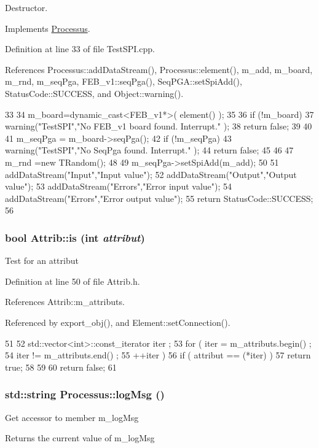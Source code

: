 Destructor. 

Implements \hyperlink{classProcessus_aee88ad7b77ae7319cf8b128e9dd2ea11}{Processus}.

Definition at line 33 of file TestSPI.cpp.

References Processus::addDataStream(), Processus::element(), m\_\-add, m\_\-board, m\_\-rnd, m\_\-seqPga, FEB\_\-v1::seqPga(), SeqPGA::setSpiAdd(), StatusCode::SUCCESS, and Object::warning().


\begin{DoxyCode}
33                                  {
34   m_board=dynamic_cast<FEB_v1*>( element() );
35   
36   if (!m_board){
37     warning("TestSPI","No FEB_v1 board found. Interrupt."  );
38     return false;
39   }
40 
41   m_seqPga = m_board->seqPga();
42   if (!m_seqPga){
43     warning("TestSPI","No SeqPga found. Interrupt."  );
44     return false;
45   }
46 
47   m_rnd =new TRandom();
48 
49   m_seqPga->setSpiAdd(m_add);
50   
51   addDataStream("Input","Input value");
52   addDataStream("Output","Output value");
53   addDataStream("Errors","Error input value");
54   addDataStream("Errors","Error output value");
55   return StatusCode::SUCCESS;
56 }
\end{DoxyCode}
\hypertarget{classAttrib_a704f26af560909ad22065083bb7d4c34}{
\subsubsection[{is}]{\setlength{\rightskip}{0pt plus 5cm}bool Attrib::is (int {\em attribut})}}
\label{classAttrib_a704f26af560909ad22065083bb7d4c34}
Test for an attribut 

Definition at line 50 of file Attrib.h.

References Attrib::m\_\-attributs.

Referenced by export\_\-obj(), and Element::setConnection().


\begin{DoxyCode}
51   {
52     std::vector<int>::const_iterator iter ;
53     for ( iter  = m_attributs.begin() ;
54           iter != m_attributs.end()   ;
55           ++iter ) {
56       if ( attribut == (*iter) ) {
57         return true;
58       }
59     }
60     return false;
61   }
\end{DoxyCode}
\hypertarget{classProcessus_a42fdeb17dc13ba854222666b6aa29b61}{
\subsubsection[{logMsg}]{\setlength{\rightskip}{0pt plus 5cm}std::string Processus::logMsg ()}}
\label{classProcessus_a42fdeb17dc13ba854222666b6aa29b61}
Get accessor to member m\_\-logMsg \begin{DoxyReturn}{Returns}
the current value of m\_\-logMsg 
\end{DoxyReturn}


